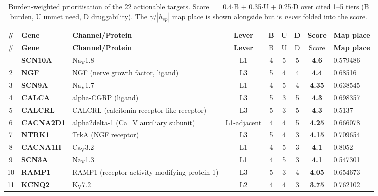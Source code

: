 \documentclass[11pt]{article}
\newcommand{\NaVx}[2]{\ensuremath{\mathrm{#1_{V}}}#2}
\begin{document}
\begin{footnotesize}
\renewcommand{\arraystretch}{1.15}
\begin{longtable}{@{}cl>{\raggedright\arraybackslash}p{1.7cm}cS[table-format=1.1]S[table-format=1.1]S[table-format=1.1]S[table-format=1.2]l@{}}
\caption{Burden-weighted prioritisation of the 22 actionable targets. Score $=$ 0.4$\cdot$B $+$ 0.35$\cdot$U $+$ 0.25$\cdot$D over cited 1--5 tiers (B burden, U unmet need, D druggability). The $\gamma$/$|h_{sp}|$ map place is shown alongside but is \emph{never} folded into the score.}\label{tab:prio}\\
\toprule
\# & \textbf{Gene} & \textbf{Channel/Protein} & \textbf{Lever} & {B} & {U} & {D} & {Score} & \textbf{Map place}\\
\midrule
\endfirsthead
\toprule
\# & \textbf{Gene} & \textbf{Channel/Protein} & \textbf{Lever} & {B} & {U} & {D} & {Score} & \textbf{Map place}\\
\midrule
\endhead
\bottomrule
{} & \textbf{SCN10A} & \NaVx{Na}{1.8} & L1 & 4 & 5 & 5 & \textbf{4.6} & \footnotesize 0.579486\\
2 & \textbf{NGF} & NGF (nerve growth factor, ligand) & L3 & 5 & 4 & 4 & \textbf{4.4} & \footnotesize 0.68516\\
3 & \textbf{SCN9A} & \NaVx{Na}{1.7} & L1 & 4 & 5 & 4 & \textbf{4.35} & \footnotesize 0.638545\\
4 & \textbf{CALCA} & alpha-CGRP (ligand) & L3 & 5 & 3 & 5 & \textbf{4.3} & \footnotesize 0.698357\\
5 & \textbf{CALCRL} & CALCRL (calcitonin-receptor-like receptor) & L3 & 5 & 3 & 5 & \textbf{4.3} & \footnotesize 0.5137\\
6 & \textbf{CACNA2D1} & alpha2delta-1 (Ca\_V auxiliary subunit) & L1-adjacent & 4 & 4 & 5 & \textbf{4.25} & \footnotesize 0.666078\\
7 & \textbf{NTRK1} & TrkA (NGF receptor) & L3 & 5 & 4 & 3 & \textbf{4.15} & \footnotesize 0.709654\\
8 & \textbf{CACNA1H} & \NaVx{Ca}{3.2} & L1 & 4 & 5 & 3 & \textbf{4.1} & \footnotesize 0.8052\\
9 & \textbf{SCN3A} & \NaVx{Na}{1.3} & L1 & 4 & 5 & 3 & \textbf{4.1} & \footnotesize 0.547301\\
10 & \textbf{RAMP1} & RAMP1 (receptor-activity-modifying protein 1) & L3 & 5 & 3 & 4 & \textbf{4.05} & \footnotesize 0.654673\\
11 & \textbf{KCNQ2} & \NaVx{K}{7.2} & L2 & 4 & 4 & 3 & \textbf{3.75} & \footnotesize 0.762102\\

\end{longtable}
\end{footnotesize}
\end{document}
